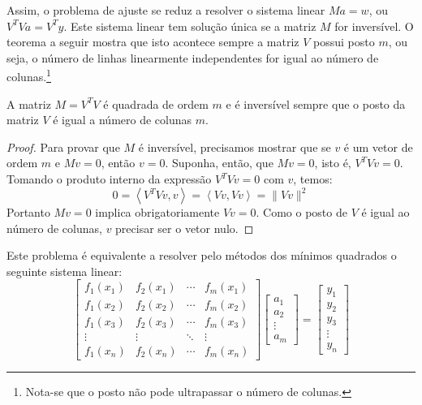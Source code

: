 Assim, o problema de ajuste se reduz a resolver o sistema linear $Ma=w$, ou $V^TVa = V^T y$. Este sistema linear tem solução única se a matriz $M$ for inversível. O teorema a seguir mostra que isto acontece sempre a matriz $V$ possui posto $m$, ou seja, o número de linhas linearmente independentes for igual ao número de colunas.\footnote{Nota-se que o posto não pode ultrapassar o número de colunas.}


\begin{teo}
A matriz $M=V^TV$ é quadrada de ordem $m$ e é inversível sempre que o posto da matriz $V$ é igual a número de colunas $m$.
\end{teo}
\begin{proof}
Para provar que $M$ é inversível, precisamos mostrar que se $v$ é um vetor de ordem $m$ e $Mv=0$, então $v=0$. Suponha, então, que $Mv=0$, isto é, 
$V^TVv=0$. Tomando o produto interno da expressão $V^TVv=0$ com $v$, temos:
\begin{equation} 0=\left<V^TVv,v\right>=\left<Vv,Vv\right>=\|Vv\|^2 \end{equation}
Portanto $Mv=0$ implica obrigatoriamente $Vv=0$. Como o posto de $V$ é igual ao número de colunas, $v$ precisar ser o vetor nulo.
\end{proof}

\begin{obs} Este problema é equivalente a resolver pelo métodos dos mínimos quadrados o seguinte sistema linear:
  \begin{equation}
    \begin{bmatrix}
      f_1(x_1)&f_2(x_1) & \cdots & f_m(x_1)\\
      f_1(x_2)&f_2(x_2) & \cdots & f_m(x_2)\\
      f_1(x_3)&f_2(x_3) & \cdots & f_m(x_3)\\
      \vdots & \vdots & \ddots & \vdots\\
      f_1(x_n)&f_2(x_n) & \cdots & f_m(x_n)
    \end{bmatrix}
    \begin{bmatrix}
      a_1\\
      a_2\\
      \vdots\\
      a_m
    \end{bmatrix}
    =\begin{bmatrix}
      y_1\\
      y_2\\
      y_3\\
      \vdots\\
      y_n
    \end{bmatrix}
  \end{equation}
\end{obs}


